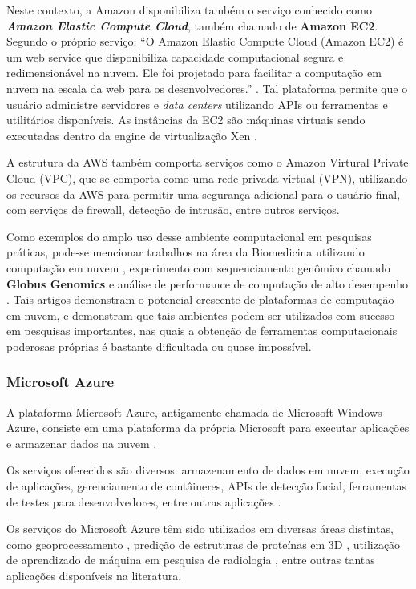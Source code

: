 \documentclass[
	12pt,				%
	a4paper,			%
	english,			%
	french,				%
	spanish,			%
	brazil				%
	]{abntex2}
\begin{document}
Neste contexto, a Amazon disponibiliza também o serviço conhecido como \emph{\textbf{Amazon Elastic Compute Cloud}}, também chamado de \textbf{Amazon EC2}. Segundo o próprio serviço: ``O Amazon Elastic Compute Cloud (Amazon EC2) é um web service que disponibiliza capacidade computacional segura e redimensionável na nuvem. Ele foi projetado para facilitar a computação em nuvem na escala da web para os desenvolvedores.'' \cite{amazonec2}. Tal plataforma permite que o usuário administre servidores e \emph{data centers} utilizando APIs ou ferramentas e utilitários disponíveis. As instâncias da EC2 são máquinas virtuais sendo executadas dentro da engine de virtualização Xen \cite{xenengine, zhang2010cloud}.

A estrutura da AWS também comporta serviços como o Amazon Virtural Private Cloud (VPC), que se comporta como uma rede privada virtual (VPN), utilizando os recursos da AWS para permitir uma segurança adicional para o usuário final, com serviços de firewall, detecção de intrusão, entre outros serviços.

Como exemplos do amplo uso desse ambiente computacional em pesquisas práticas, pode-se mencionar trabalhos na área da Biomedicina utilizando computação em nuvem \cite{fusaro2011biomedical}, experimento com sequenciamento genômico chamado \textbf{Globus Genomics} \cite{madduri2014experiences} e análise de performance de computação de alto desempenho \cite{jackson2010performance}. Tais artigos demonstram o potencial crescente de plataformas de computação em nuvem, e demonstram que tais ambientes podem ser utilizados com sucesso em pesquisas importantes, nas quais a obtenção de ferramentas computacionais poderosas próprias é bastante dificultada ou quase impossível.

\subsubsection{Microsoft Azure}

A plataforma Microsoft Azure, antigamente chamada de Microsoft Windows Azure, consiste em uma plataforma da própria Microsoft para executar aplicações e armazenar dados na nuvem \cite{chappell2009introducing}.

Os serviços oferecidos são diversos: armazenamento de dados em nuvem, execução de aplicações, gerenciamento de contâineres, APIs de detecção facial, ferramentas de testes para desenvolvedores, entre outras aplicações \cite{microsoftazure}. 

Os serviços do Microsoft Azure têm sido utilizados em diversas áreas distintas, como geoprocessamento \cite{gong2010geoprocessing}, predição de estruturas de proteínas em 3D \cite{mrozek2015scaling}, utilização de aprendizado de máquina em pesquisa de radiologia \cite{kohli2017implementing}, entre outras tantas aplicações disponíveis na literatura.
\end{document}
